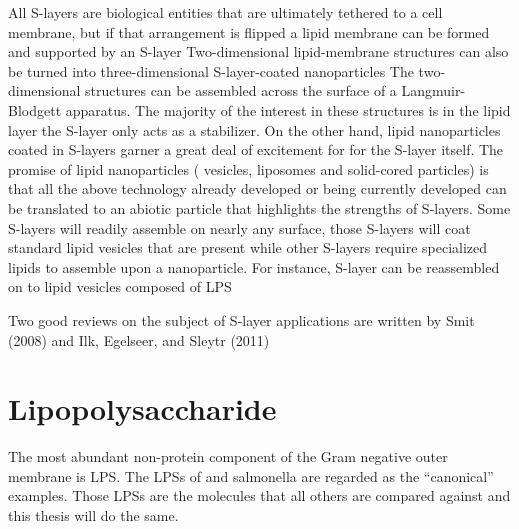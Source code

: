   All \acp{S-layer} are biological entities that are ultimately tethered to a cell membrane, but if that arrangement is flipped a lipid membrane can be formed and supported by an \ac{S-layer} Two-dimensional lipid-membrane structures can also be turned into three-dimensional \ac{S-layer}-coated nanoparticles The two-dimensional structures can be assembled across the surface of a Langmuir-Blodgett apparatus. The majority of the interest in these structures is in the lipid layer the \ac{S-layer} only acts as a stabilizer. On the other hand, lipid nanoparticles coated in \acp{S-layer} garner a great deal of excitement for for the \ac{S-layer} itself. The promise of lipid nanoparticles (\ie{} vesicles, liposomes and solid-cored particles) is that all the above technology already developed or being currently developed can be translated to an abiotic particle that highlights the strengths of \acp{S-layer}. Some \acp{S-layer} will readily assemble on nearly any surface, those \acp{S-layer} will coat standard lipid vesicles that are present while other \acp{S-layer} require specialized lipids to assemble upon a nanoparticle. For instance, \caulobacter \ac{S-layer} can be reassembled on to lipid vesicles composed of \caulobacter{} \ac{LPS} 
  
  Two good reviews on the subject of \ac{S-layer} applications are written by Smit (2008) and Ilk, Egelseer, and Sleytr (2011)

\section{Lipopolysaccharide}\label{sec:intro-lps}
The most abundant non-protein  component of the Gram negative outer membrane is
\ac{LPS}. The \acp{LPS} of \ecoli and \ac{salmonella} are regarded as the
``canonical'' examples. Those \acp{LPS} are the molecules that all others are
compared against and this thesis will do the same. 

